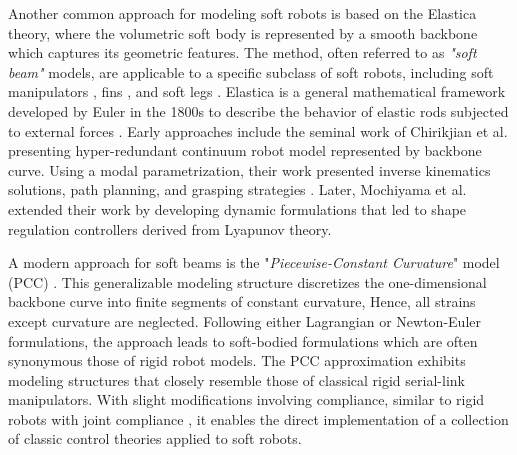 Another common approach for modeling soft robots is based on the Elastica theory, where the volumetric soft body is represented by a smooth backbone which captures its geometric features. The method, often referred to as \emph{"soft beam"} models, are applicable to a specific subclass of soft robots, including soft manipulators \cite{Falkenhahn2015,Marchese2016,Jones2006,Webster2010}, fins \cite{Katzschmann2019,Marchese2014}, and soft legs \cite{Drotman2021Feb,vanLaake2022Sep}. Elastica is a general mathematical framework developed by Euler in the 1800s to describe the behavior of elastic rods subjected to external forces \cite{Levien2008,Antman2005}. Early approaches include the seminal work of Chirikjian et al. \cite{Chirikjian1989,Chirikjian1991,Chirikjian1992} presenting hyper-redundant continuum robot model represented by backbone curve. Using a modal parametrization, their work presented inverse kinematics solutions, path planning, and grasping strategies \cite{Chirikjian1992}. Later, Mochiyama et al. \cite{Mochiyama1992,Mochiyama1999} extended their work by developing dynamic formulations that led to shape regulation controllers derived from Lyapunov theory. 

A modern approach for soft beams is the "\emph{Piecewise-Constant Curvature}" model (PCC) \cite{Webster2010}. This generalizable modeling structure discretizes the one-dimensional backbone curve into finite segments of constant curvature, Hence, all strains except curvature are neglected. Following either Lagrangian or Newton-Euler formulations, the approach leads to soft-bodied formulations which are often synonymous those of rigid robot models. The PCC approximation exhibits modeling structures that closely resemble those of classical rigid serial-link manipulators. With slight modifications involving compliance, similar to rigid robots with joint compliance \cite{DeLuca2016Jul,Lynch2017}, it enables the direct implementation of a collection of classic control theories \cite{Katzschmann2018,DellaSantina2020,Franco2020,Franco2022May,Jones2006,Kazemipour2022May,Godage2015,Godage2016} applied to soft robots.

